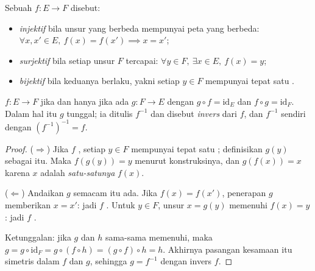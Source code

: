 \begin{definition}\label{def:b1:logic:inj}
Sebuah  $f \colon E \to F$ disebut:
\begin{itemize}
  \item \emph{injektif} bila unsur yang berbeda
        mempunyai peta yang berbeda: $\forall x, x' \in E,\ f(x) = f(x') \implies
        x = x'$;
  \item \emph{surjektif} bila setiap unsur $F$
        tercapai: $\forall y \in F,\ \exists x \in E,\ f(x) = y$;
  \item \emph{bijektif} bila keduanya berlaku, yakni
        setiap $y \in F$ mempunyai tepat satu .
\end{itemize}
\end{definition}

\begin{theorem}\label{thm:b1:logic:inverse}
 $f \colon E \to F$  jika dan hanya jika ada 
$g \colon F \to E$ dengan $g \circ f = \mathrm{id}_E$ dan $f \circ g =
\mathrm{id}_F$. Dalam hal itu $g$ tunggal; ia ditulis $f^{-1}$ dan
disebut \emph{invers} dari $f$, dan $f^{-1}$ sendiri  dengan
$(f^{-1})^{-1} = f$.
\end{theorem}

\begin{proof}
($\Rightarrow$) Jika $f$ , setiap $y \in F$ mempunyai tepat
satu ; definisikan $g(y)$ sebagai  itu. Maka
$f(g(y)) = y$ menurut konstruksinya, dan $g(f(x)) = x$ karena $x$
adalah \emph{satu-satunya}  $f(x)$.

($\Leftarrow$) Andaikan $g$ semacam itu ada. Jika $f(x) = f(x')$,
penerapan $g$ memberikan $x = x'$: jadi $f$ . Untuk
$y \in F$, unsur $x = g(y)$
memenuhi $f(x) = y$: jadi $f$ .

Ketunggalan: jika $g$ dan $h$ sama-sama memenuhi, maka
$g = g \circ \mathrm{id}_F
= g \circ (f \circ h) = (g \circ f) \circ h = h$. Akhirnya pasangan
kesamaan itu simetris dalam $f$ dan $g$, sehingga $g = f^{-1}$
 dengan invers $f$.
\end{proof}

